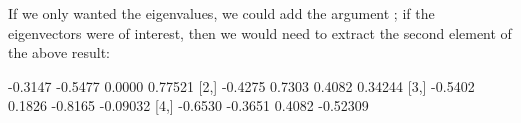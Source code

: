 If we only wanted the eigenvalues, we could add the argument ; if the eigenvectors were of interest, then we would need to extract the second element of the above result: 

\begin{Schunk}
\begin{Soutput}
        [,1]    [,2]    [,3]     [,4]
[1,] -0.3147 -0.5477  0.0000  0.77521
[2,] -0.4275  0.7303  0.4082  0.34244
[3,] -0.5402  0.1826 -0.8165 -0.09032
[4,] -0.6530 -0.3651  0.4082 -0.52309
\end{Soutput}
\end{Schunk}



